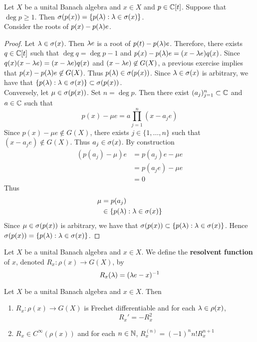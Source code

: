 \documentclass{book}
\begin{document}
\begin{ex}
	Let $X$ be a unital Banach algebra and $x \in X$ and $p \in \mathbb{C}[t]$. Suppose that $\deg p \geq 1$. Then $\sigma(p(x)) = \{p(\lambda): \lambda \in \sigma(x)\}$. \\
	 Consider the roots of $p(x) - p(\lambda)e$. 
\end{ex}

\begin{proof}
	Let $\lambda \in \sigma(x)$. Then $\lambda e$ is a root of $p(t) - p(\lambda) e$. Therefore, there exists $q \in \mathbb{C}[t]$ such that $\deg q = \deg p -1$ and $p(x) - p(\lambda) e = (x - \lambda e)q(x)$. Since $q(x) (x - \lambda e) = (x - \lambda e) q(x)$ and $(x - \lambda e) \not \in G(X)$, a previous exercise implies that $p(x) - p(\lambda) e \not \in G(X)$. Thus $p(\lambda) \in \sigma(p(x))$. Since $\lambda \in \sigma(x)$ is arbitrary, we have that $\{p(\lambda): \lambda \in \sigma(x)\} \subset \sigma(p(x))$. \\
	Conversely, let $\mu \in \sigma(p(x))$. Set $n = \deg p$. Then there exist $(a_j)_{j=1}^n \subset \mathbb{C}$ and $a \in \mathbb{C}$ such that 
	$$p(x) - \mu e = a \prod_{j=1}^{n} (x - a_j e)$$ 
	Since $p(x) - \mu e \not \in G(X)$, there exists $j \in \{1, \ldots, n\}$ such that $(x - a_je) \not \in G(X)$. Thus $a_j \in \sigma(x)$. By construction 
	\begin{align*}
		(p(a_j) - \mu )e 
		& = p(a_j)e - \mu e \\
		& = p(a_j e) - \mu e \\
		& = 0
	\end{align*}
	Thus 
	\begin{align*}
		\mu 
		& = p(a_j) \\
		& \in \{p(\lambda): \lambda \in \sigma(x)\}
	\end{align*}
	Since $\mu \in \sigma(p(x))$ is arbitrary, we have that $\sigma(p(x)) \subset \{p(\lambda): \lambda \in \sigma(x)\}$. Hence $\sigma(p(x)) = \{p(\lambda): \lambda \in \sigma(x)\}$.
\end{proof}

\begin{defn}
	Let $X$ be a unital Banach algebra and $x \in X$. We define the \textbf{resolvent function} of $x$, denoted $R_x: \rho(x) \rightarrow G(X)$, by  
	$$R_x(\lambda) = (\lambda e - x)^{-1}$$
\end{defn}

\begin{ex}
	Let $X$ be a unital Banach algebra and $x \in X$. Then 
	\begin{enumerate}
		\item $R_x: \rho(x) \rightarrow G(X)$ is Frechet differentiable and for each $\lambda \in \rho(x)$, 
		$$R_x' = -R_x^2$$
		\item $R_x \in C^{\infty}(\rho(x))$ and for each $n \in \mathbb{N}$, $R_x^{(n)} = (-1)^n n! R_x^{n+1}$
	\end{enumerate}
\end{ex}
\end{document}
